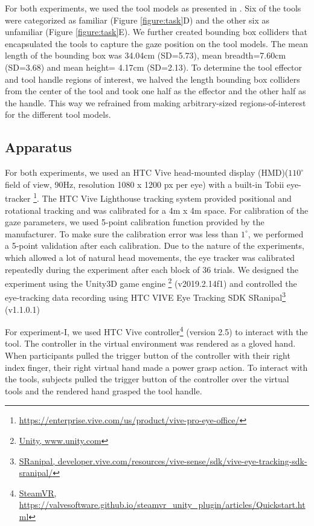 For both experiments, we used the tool models as presented in \citet{Belardinelli2016-xb}. Six of the tools were categorized as familiar (Figure \ref{figure:task}D) and the other six as unfamiliar (Figure \ref{figure:task}E). We further created bounding box colliders that encapsulated the tools to capture the gaze position on the tool models. The mean length of the bounding box was 34.04cm (SD=5.73), mean breadth=7.60cm (SD=3.68) and mean height= 4.17cm (SD=2.13). To determine the tool effector and tool handle regions of interest, we halved the length bounding box colliders from the center of the tool and took one half as the effector and the other half as the handle. This way we refrained from making arbitrary-sized regions-of-interest for the different tool models. 

\subsection{Apparatus}
For both experiments, we used an HTC Vive head-mounted display (HMD)($110^\circ$ field of view, 90Hz, resolution 1080 x 1200 px per eye) with a built-in Tobii  eye-tracker \footnote{\href{https://enterprise.vive.com/us/product/vive-pro-eye/}{https://enterprise.vive.com/us/product/vive-pro-eye-office/}}. The HTC Vive Lighthouse tracking system provided positional and rotational tracking and was calibrated for a 4m x 4m space. For calibration of the gaze parameters, we used 5-point calibration function provided by the manufacturer. To make sure the calibration error was less than $1^\circ$, we performed a 5-point validation after each calibration. Due to the nature of the experiments, which allowed a lot of natural head movements, the eye tracker was calibrated repeatedly during the experiment after each block of 36 trials. We designed the experiment using the Unity3D game engine \footnote{\href{www.unity.com}{Unity, www.unity.com}} (v2019.2.14f1) and controlled the eye-tracking data recording using HTC VIVE Eye Tracking SDK SRanipal\footnote{\href{https://developer.vive.com/resources/vive-sense/sdk/vive-eye-tracking-sdk-sranipal/}{SRanipal, developer.vive.com/resources/vive-sense/sdk/vive-eye-tracking-sdk-sranipal/}} (v1.1.0.1)

For experiment-I, we used HTC Vive controller\footnote{\href{https://valvesoftware.github.io/steamvr_unity_plugin/articles/Quickstart.html}{SteamVR, https://valvesoftware.github.io/steamvr\_unity\_plugin/articles/Quickstart.html}} (version 2.5) to interact with the tool. The controller in the virtual environment was rendered as a gloved hand. When participants pulled the trigger button of the controller with their right index finger, their right virtual hand made a power grasp action. To interact with the tools, subjects pulled the trigger button of the controller over the virtual tools and the rendered hand grasped the tool handle.

